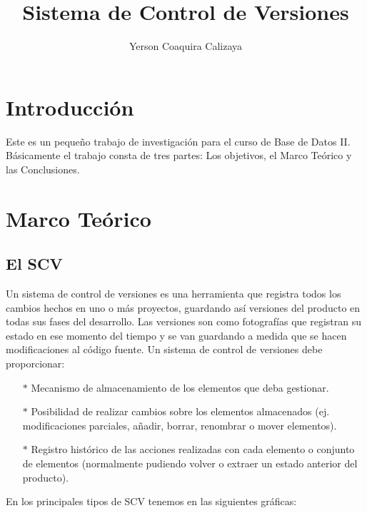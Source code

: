 \documentclass[12pt]{article}
\title{Sistema de Control de Versiones}
\author{Yerson Coaquira Calizaya}
\begin{document}
\maketitle
\section{Introducción}
Este es un pequeño trabajo de investigación para el curso de Base de Datos II.
Básicamente el trabajo consta de tres partes: Los objetivos, el Marco Teórico y las Conclusiones. 

\section{Marco Teórico}

\subsection{El SCV}
Un sistema de control de versiones es una herramienta que registra todos los cambios hechos en uno o más proyectos, guardando así versiones del producto en todas sus fases del desarrollo. Las versiones son como fotografías que registran su estado en ese momento del tiempo y se van guardando a medida que se hacen modificaciones al código fuente. \newline
Un sistema de control de versiones debe proporcionar:
\begin{itemize}
	\item[$*$] Mecanismo de almacenamiento de los elementos que deba gestionar.
	\item[$*$] Posibilidad de realizar cambios sobre los elementos almacenados (ej. modificaciones parciales, añadir, borrar, renombrar o mover elementos).
	\item[$*$] Registro histórico de las acciones realizadas con cada elemento o conjunto de elementos (normalmente pudiendo volver o extraer un estado anterior del producto).
\end{itemize}

En los principales tipos de SCV tenemos en las siguientes gráficas:
\end{document}
